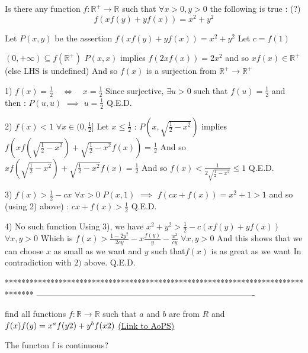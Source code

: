 \begin{solution}
	\begin{tcolorbox}Is there any function $f: \mathbb{R}^{+} \to \mathbb{R}$ such that $\forall x > 0 ,y >0$ the following is true : (?)
$$f(xf(y)+yf(x))=x^2+y^2$$\end{tcolorbox}
Let $P(x,y)$ be the assertion $f(xf(y)+yf(x))=x^2+y^2$
Let $c=f(1)$

$(0,+\infty)\subseteq f(\mathbb R^+)$
$P(x,x)$ implies $f(2xf(x))=2x^2$ and so $xf(x)\in\mathbb R^+$ (else LHS is undefined)
And so $f(x)$ is a surjection from $\mathbb R^+\to\mathbb R^+$

1) $f(x)=\frac 12\quad\iff\quad x=\frac 12$
Since surjective, $\exists u>0$ such that $f(u)=\frac 12$ and then :
$P(u,u)$ $\implies$ $u=\frac 12$
Q.E.D.


2) $f(x)<1$ $\forall x\in(0,\frac 12]$
Let $x\le\frac 12$ :
$P(x,\sqrt{\frac 12-x^2})$ implies $f(xf(\sqrt{\frac 12-x^2})+\sqrt{\frac 12-x^2}f(x))=\frac 12$
And so $xf(\sqrt{\frac 12-x^2})+\sqrt{\frac 12-x^2}f(x)=\frac 12$
And so $f(x)<\frac 1{2\sqrt{\frac 12-x^2}}\le 1$
Q.E.D.

3) $f(x)>\frac 12-cx$ $\forall x>0$
$P(x,1)$ $\implies$ $f(cx+f(x))=x^2+1>1$ and so (using 2) above) :
$cx+f(x)>\frac 12$
Q.E.D.

4) No such function
Using 3), we have $x^2+y^2>\frac 12-c(xf(y)+yf(x))$ $\forall x,y>0$
Which is $f(x)>\frac{1-2y^2}{2cy}-x\frac{f(y)}y-\frac{x^2}{cy}$ $\forall x,y>0$
And this shows that we can choose $x$ as small as we want and $y$ such that$f(x)$ is as great as we want
In contradiction with $2)$ above.
Q.E.D.


\end{solution}
*******************************************************************************
-------------------------------------------------------------------------------

\begin{problem}
	find all functions $f: \mathbb{R} \rightarrow \mathbb{R}$ such that $a$ and $b$ are from $R$ and 
  $f(x)f(y)=x^af(y\/2)+y^bf(x\/2)$
	\flushright \href{https://artofproblemsolving.com/community/c6h1567808}{(Link to AoPS)}
\end{problem}



\begin{solution}
	The functon f is continuous?
\end{solution}



